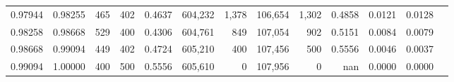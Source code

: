 \begin{tabular}{rrrrrrrrrrrrr}
0.97944 & 0.98255 &   465 & 402 &                                     0.4637 & 604,232 &   1,378 & 106,654 &   1,302 & 0.4858 & 0.0121 & 0.0128 \\
0.98258 & 0.98668 &   529 & 400 &                                     0.4306 & 604,761 &     849 & 107,054 &     902 & 0.5151 & 0.0084 & 0.0079 \\
0.98668 & 0.99094 &   449 & 402 &                                     0.4724 & 605,210 &     400 & 107,456 &     500 & 0.5556 & 0.0046 & 0.0037 \\
0.99094 & 1.00000 &   400 & 500 &                                     0.5556 & 605,610 &       0 & 107,956 &       0 &    nan & 0.0000 & 0.0000 \\
\bottomrule
\end{tabular}

